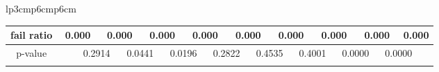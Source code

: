 {\begin{tabular}{lp{3cm}p{6cm}p{6cm}}
\begin{tabular}[h]{m{2.5cm}m{}m{}m{}m{}m{}m{}m{}m{}m{}m{}m{}m{}m{}m{}m{}m{}m{}m{}}
\hline
\multicolumn{1}{c}{fail ratio}&\multicolumn{2}{c}{           0.000}&\multicolumn{2}{c}{     0.000}&\multicolumn{2}{c}{     0.000}&\multicolumn{2}{c}{     0.000}&\multicolumn{2}{c}{     0.000}&\multicolumn{2}{c}{     0.000}&\multicolumn{2}{c}{     0.000}&\multicolumn{2}{c}{     0.000}&\multicolumn{2}{c}{     0.000}\\
\hline
\multicolumn{1}{c}{p-value}&&\multicolumn{2}{c}{0.2914}&\multicolumn{2}{c}{0.0441}&\multicolumn{2}{c}{0.0196}&\multicolumn{2}{c}{0.2822}&\multicolumn{2}{c}{0.4535}&\multicolumn{2}{c}{0.4001}&\multicolumn{2}{c}{0.0000}&\multicolumn{2}{c}{0.0000}\\
&&&&&&&&&&&&&&&&&&\end{tabular}
\end{tabular}
}
